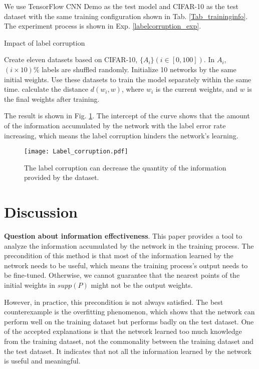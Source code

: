 \documentclass[letterpaper]{article} %
\begin{document}
We use TensorFlow CNN Demo as the test model and CIFAR-10 as the test dataset with the same training configuration shown in Tab. \ref{Tab_traininginfo}. The experiment process is shown in Exp. \ref{labelcorruption_exp}.

\begin{algorithm}[ht]
\caption{Impact of label corruption \label{labelcorruption_exp}}
\begin{algorithmic}[1]
    \STATE Create eleven datasets based on CIFAR-10, $\{A_i\} (i\in [0,100])$. In $A_i$, $(i\times 10)\%$ labels are shuffled randomly.
    \STATE Initialize 10 networks by the same initial weights.
    \STATE Use these datasets to train the model separately within the same time.
    \STATE calculate the distance $d(w_i, w)$, where $w_i$ is the current weights, and $w$ is the final weights after training.
\end{algorithmic}
\end{algorithm}

The result is shown in Fig. \ref{Label_corruption}. The intercept of the curve shows that the amount of the information accumulated by the network with the label error rate increasing, which means the label corruption hinders the network's learning.
\begin{figure}[htb]
    \centering
    \texttt{[image: Label\_corruption.pdf]}
    \caption{The label corruption can decrease the quantity of the information provided by the dataset.}
    \label{Label_corruption}
\end{figure}

\section{Discussion}
\textbf{Question about information effectiveness}. This paper provides a tool to analyze the information accumulated by the network in the training process. The precondition of this method is that most of the information learned by the network needs to be useful, which means the training process's output needs to be fine-tuned. Otherwise, we cannot guarantee that the nearest points of the initial weights in $supp(P)$ might not be the output weights.

However, in practice, this precondition is not always satisfied. The best counterexample is the overfitting phenomenon, which shows that the network can perform well on the training dataset but performs badly on the test dataset. One of the accepted explanations is that the network learned too much knowledge from the training dataset, not the commonality between the training dataset and the test dataset. It indicates that not all the information learned by the network is useful and meaningful.
\end{document}
